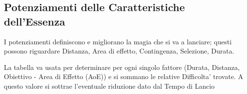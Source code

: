 \documentclass[a4paper,11pt,twoside,openany]{book}
\begin{document}
\subsection{Potenziamenti delle Caratteristiche dell'Essenza}

\label{potenziamenti-delle-caratteristiche-dellessenza}

I potenziamenti definiscono e migliorano la magia che si va a lanciare; questi possono riguardare Distanza, Area di effetto, Contingenza, Selezione, Durata.

La tabella va usata per determinare per ogni singolo fattore (Durata, Distanza, Obiettivo - Area di Effetto (AoE)) e si sommano le relative Difficolta' trovate.
A questo valore si sottrae l'eventuale riduzione dato dal Tempo di Lancio


\bigskip
\end{document}
